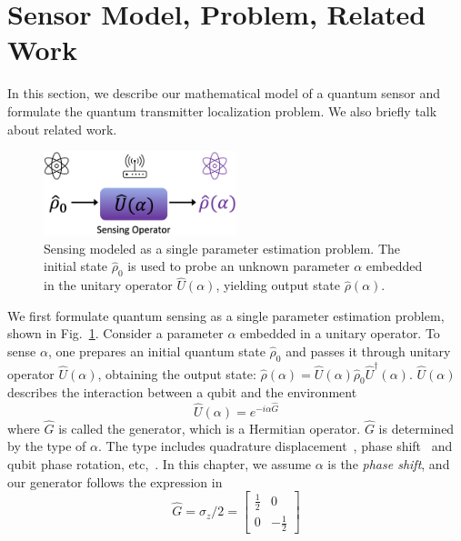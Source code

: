 \section{Sensor Model, Problem, Related Work}
\label{sec:quantum_problem}

In this section, we describe our mathematical model of a quantum sensor and formulate the quantum transmitter localization problem.
We also briefly talk about related work.

\begin{figure}[h]
    \centering
    \includegraphics[width=0.5\textwidth]{chapters/icc/figures/unitary.png}
    \caption{Sensing modeled as a single parameter estimation problem. The initial state $\hat{\rho}_{0}$ is used to probe an unknown parameter $\alpha$ embedded in the unitary operator $\hat{U}(\alpha)$, yielding output state $\hat{\rho}(\alpha)$.}
    \label{fig:unitary}
\end{figure}
 We first formulate quantum sensing as a single parameter estimation problem, shown in Fig.~\ref{fig:unitary}.
Consider a parameter $\alpha$ embedded in a unitary operator.
To sense $\alpha$, one prepares an initial quantum state $\hat{\rho}_{0}$ and passes it through unitary operator $\hat{U}(\alpha)$, obtaining the output state:
$\hat{\rho}(\alpha) = \hat{U}(\alpha) \hat{\rho}_{0} \hat{U}^{\dagger}(\alpha)$.
$\hat{U}(\alpha)$ describes the interaction between a qubit and the environment~\cite{arizona21-thesis}
\begin{equation}
    \hat{U}(\alpha) = e^{-i\alpha \hat{G}}
    \label{equ:unitary_generator}
\end{equation}
where $\hat{G}$ is called the generator, which is a Hermitian operator.
$\hat{G}$ is determined by the type of $\alpha$.
The type includes quadrature displacement~\cite{PRL20-qsn}, phase shift~\cite{nature21_phase} and qubit phase rotation, etc,~\cite{Zhang_2021}. 
In this chapter, we assume $\alpha$ is the \emph{phase shift}, and our generator follows the expression in~\cite{nature21_phase}
\begin{equation}
    \hat{G} = \sigma_z / 2 = 
    \begin{bmatrix}
    \frac{1}{2} & 0\\
    0 & -\frac{1}{2}
    \end{bmatrix}
    \label{equ:generator}
\end{equation}
